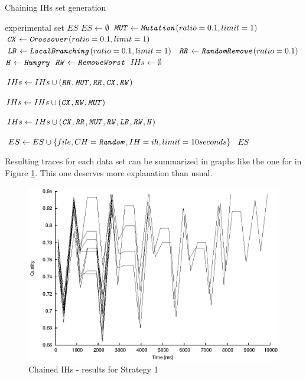 \begin{algorithm}
\caption{Chaining IHs set generation}
\label{listing-experiment-chaining-ihs}
\begin{algorithmic}
\ENSURE experimental set $ES$
\STATE $ES \gets \emptyset$
\STATE $\texttt{\textit{MUT}} \gets \texttt{\textit{Mutation}}(ratio = 0.1, limit = 1)$
\STATE $\texttt{\textit{CX}} \gets \texttt{\textit{Crossover}}(ratio = 0.1, limit = 1)$
\STATE $\texttt{\textit{LB}} \gets \texttt{\textit{LocalBranching}}(ratio = 0.1, limit = 1)$
\STATE $\texttt{\textit{RR}} \gets \texttt{\textit{RandomRemove}}(ratio = 0.1)$
\STATE $\texttt{\textit{H}} \gets \texttt{\textit{Hungry}}$
\STATE $\texttt{\textit{RW}} \gets \texttt{\textit{RemoveWorst}}$
\STATE $IHs \gets \emptyset$

\STATE $IHs \gets IHs \cup (\texttt{\textit{RR}}, \texttt{\textit{MUT}}, \texttt{\textit{RR}}, \texttt{\textit{CX}}, \texttt{\textit{RW}})$

\STATE $IHs \gets IHs \cup (\texttt{\textit{CX}}, \texttt{\textit{RW}}, \texttt{\textit{MUT}})$

\STATE $IHs \gets IHs \cup (\texttt{\textit{CX}}, \texttt{\textit{RR}}, \texttt{\textit{MUT}}, \texttt{\textit{RW}}, \texttt{\textit{LB}}, \texttt{\textit{RW}}, \texttt{\textit{H}})$

      \STATE $ES \gets ES \cup \{file, CH = \texttt{\textit{Random}}, IH = ih, limit = 10 seconds\}$
    \ENDFOR
  \ENDFOR
\ENDFOR
\RETURN $ES$
\end{algorithmic}
\end{algorithm}

Resulting traces for each data set can be summarized in graphs like the one for  in Figure \ref{image-experiment-chained-ihs-s1}. This one deserves more explanation than usual.

\begin{figure}
  \caption{Chained IHs -  results for Strategy 1}
  \label{image-experiment-chained-ihs-s1}
  \centering
    \includegraphics[width=\textwidth]{images/experiments/chained-ihs-s1}
\end{figure}

